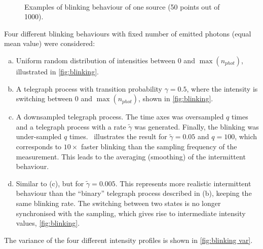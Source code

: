 \begin{figure}[!h]
	\centering
	\newcommand{\sizef}{.35}
	\\
	\subfloat[telegraph ($\tilde{\gamma}=0.05$) downsampled]{
	\texttt{[image: \\qd S455/images/blinkmatS565]}} %
	\caption{Examples of blinking behaviour of one source (50 points out of 1000).}
	\label{fig:blinking}
\end{figure}\noindent
%
Four different blinking behaviours with fixed number of emitted photons (equal mean value) were considered: 
%
\begin{enumerate}[(a)]
	\item
	Uniform random distribution of intensities between $0$ and $\max(n_{phot})$, illustrated in  \autoref{fig:blinking}\aaa. 
	\item
	A telegraph process with transition probability $\gamma=0.5$, where the intensity is switching between $0$ and $\max(n_{phot})$, shown in \autoref{fig:blinking}\bbb.
	\item
	A downsampled telegraph process. The time axes was oversampled $q$ times and a telegraph process with a rate $\tilde{\gamma}$ was generated. Finally, the blinking was under-sampled $q$ times. \ccc\ illustrates the result for $\tilde{\gamma}=0.05$ and $q=100$, which corresponds to $10\times$ faster blinking than the sampling frequency of the measurement. This leads to the averaging (smoothing) of the intermittent behaviour.
	\item
	Similar to (c), but for $\tilde{\gamma}=0.005$. This represents more realistic intermittent behaviour than the ``binary'' telegraph process described in (b), keeping the same blinking rate. The switching between two states is no longer synchronised with the sampling, which gives rise to intermediate intensity values, \autoref{fig:blinking}\ddd. 
\end{enumerate}
%
The variance of the four different intensity profiles is shown in \autoref{fig:blinking var}.
	
